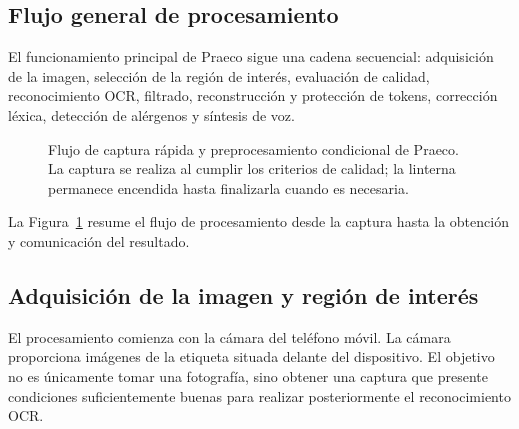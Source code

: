 \subsection{Flujo general de procesamiento}

El funcionamiento principal de Praeco sigue una cadena secuencial: adquisición de la imagen, selección de la región de interés, evaluación de calidad, reconocimiento OCR, filtrado, reconstrucción y protección de tokens, corrección léxica, detección de alérgenos y síntesis de voz.

\begin{figure}[htbp]
\centering
{}
\caption{Flujo de captura rápida y preprocesamiento condicional de Praeco. La captura se realiza al cumplir los criterios de calidad; la linterna permanece encendida hasta finalizarla cuando es necesaria.}
\label{fig:flujo-principal-praeco}
\end{figure}

La Figura~\ref{fig:flujo-principal-praeco} resume el flujo de procesamiento desde la captura hasta la obtención y comunicación del resultado.

\subsection{Adquisición de la imagen y región de interés}

El procesamiento comienza con la cámara del teléfono móvil. La cámara proporciona imágenes de la etiqueta situada delante del dispositivo. El objetivo no es únicamente tomar una fotografía, sino obtener una captura que presente condiciones suficientemente buenas para realizar posteriormente el reconocimiento OCR.

